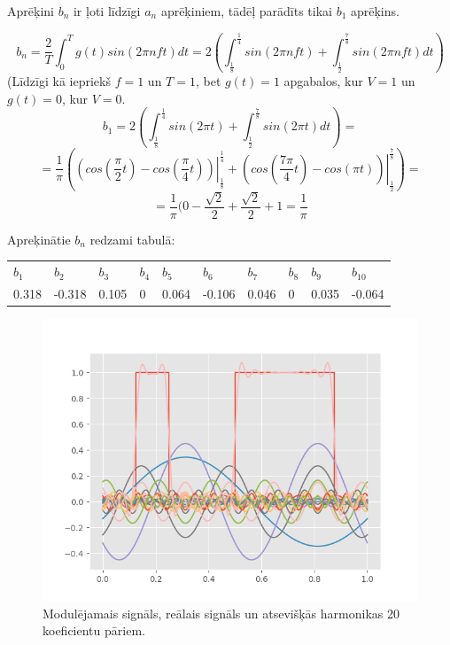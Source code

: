 \documentclass[a4paper,11pt]{article}
\begin{document}
Aprēķini $b_n$ ir ļoti līdzīgi $a_n$ aprēķiniem, tādēļ parādīts tikai $b_1$ aprēķins.

$$b_n = \frac{2}{T}\int_{0}^{T}g(t)sin(2\pi nft)dt=2(\int_{\frac{1}{8}}^\frac{1}{4}sin(2\pi nft)+\int_{\frac{1}{2}}^\frac{7}{8}sin(2\pi nft)dt)$$
(Līdzīgi kā iepriekš $f=1$ un $T=1$, bet $g(t)=1$ apgabalos, kur $V=1$ un $g(t)=0$, kur $V=0$.
$$b_1 = 2(\int_{\frac{1}{8}}^\frac{1}{4}sin(2\pi t)+\int_{\frac{1}{2}}^\frac{7}{8}sin(2\pi t)dt)=$$
$$=\frac{1}{\pi}(\left.(cos(\frac{\pi}{2}t)-cos(\frac{\pi}{4}t))\right\vert_{\frac{1}{8}}^\frac{1}{4} +\left.(cos(\frac{7\pi}{4}t)-cos(\pi t))\right\vert_{\frac{1}{2}}^\frac{7}{8})=$$
$$=\frac{1}{\pi}(0-\frac{\sqrt{2}}{2}+\frac{\sqrt{2}}{2}+1=\frac{1}{\pi}$$

Apreķinātie $b_n$ redzami tabulā:

\begin{table}[!h]
\begin{tabular}{|l|l|l|l|l|l|l|l|l|l}
\cline{1-10}
$b_1$ &$b_2$  &$b_3$  &$b_4$  &$b_5$  &$b_6$  &$b_7$  &$b_8$  &$b_9$  &$b_{10}$  \\ \cline{1-10}
 0.318 & -0.318 & 0.105 & 0 & 0.064 & -0.106 & 0.046 & 0 & 0.035 & -0.064 \\ \cline{1-10}
\end{tabular}
\end{table}

\begin{figure}
\centering
\includegraphics[scale=0.7]{Fig1.png}
\caption{Modulējamais signāls, reālais signāls un atsevišķās harmonikas 20 koeficientu pāriem.}
\label{fig1}
\end{figure}
\end{document}
